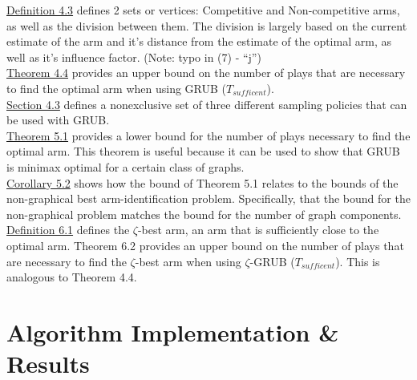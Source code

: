 \documentclass{article}[12pt]
\begin{document}
\underline{Definition 4.3} defines 2 sets or vertices: Competitive and Non-competitive arms, as well as the division between them.
The division is largely based on the current estimate of the arm and it’s distance from the estimate of the optimal arm, as well as it’s influence factor.
(Note: typo in (7) - “j”) \\

\underline{Theorem 4.4} provides an upper bound on the number of plays that are necessary to find the optimal arm when using GRUB ($T_{sufficent}$). \\

\underline{Section 4.3} defines a nonexclusive set of three different sampling policies that can be used with GRUB. \\

\underline{Theorem 5.1} provides a lower bound for the number of plays necessary to find the optimal arm.
This theorem is useful because it can be used to show that GRUB is minimax optimal for a certain class of graphs. \\

\underline{Corollary 5.2} shows how the bound of Theorem 5.1 relates to the bounds of the non-graphical best arm-identification problem.
Specifically, that the bound for the non-graphical problem matches the bound for the number of graph components. \\

\underline{Definition 6.1} defines the $\zeta$-best arm, an arm that is sufficiently close to the optimal arm.
Theorem 6.2 provides an upper bound on the number of plays that are necessary to find the $\zeta$-best arm when using $\zeta$-GRUB ($T_{sufficent}$). This is analogous to Theorem 4.4.

\pagebreak

\section{Algorithm Implementation \& Results}
\end{document}
